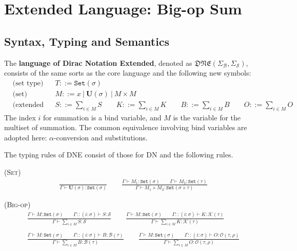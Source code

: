 \documentclass[manuscript, review, timestamp]{acmart}
\newcommand*{\Sc}{\mathcal{S}}
\newcommand*{\K}{\mathcal{K}}
\newcommand*{\B}{\mathcal{B}}
\newcommand*{\Op}{\mathcal{O}}
\begin{document}

\section{Extended Language: Big-op Sum}

\subsection{Syntax, Typing and Semantics}
\begin{definition}[DNE]
    The \textbf{language of Dirac Notation Extended}, denoted as $\mathfrak{DNE}(\Sigma_\mathcal{B}, \Sigma_\mathcal{S})$, consists of the same sorts as the core language and the following new symbols:
    \begin{align*}
        & \text{(set type)} && T ::= \texttt{Set}(\sigma) \\
        & \text{(set)} && M ::= x\ |\ \mathbf{U}(\sigma)\ |\ M \times M \\
        & \text{(extended Dirac notation)} && S ::= \sum_{i \in M} S
        \qquad K ::= \sum_{i \in M} K
        \qquad B ::= \sum_{i \in M} B
        \qquad O ::= \sum_{i \in M} O
    \end{align*}
    The index $i$ for summation is a bind variable, and $M$ is the variable for the multiset of summation. The common equivalence involving bind variables are adopted here: $\alpha$-conversion and substitutions.
\end{definition}


The typing rules of DNE consist of those for DN and the following rules.

\textsc{(Set)}
\begin{gather*}
  \frac{}{\Gamma \vdash \mathbf{U}(\sigma) : \texttt{Set}(\sigma)}
  \qquad
  \frac{\Gamma \vdash M_1 : \texttt{Set}(\sigma) \qquad \Gamma \vdash M_2 : \texttt{Set}(\tau)}{\Gamma \vdash M_1 \times M_2 : \texttt{Set}(\sigma \times \tau)}
\end{gather*}

\textsc{(Big-op)}
\begin{gather*}
  \frac{\Gamma \vdash M : \texttt{Set}(\sigma) \qquad \Gamma::(i : \sigma) \vdash S : \Sc}{\Gamma \vdash \sum_{i \in M} S : \Sc}
  \qquad
  \frac{\Gamma \vdash M : \texttt{Set}(\sigma) \qquad \Gamma::(i : \sigma) \vdash K : \K(\tau)}{\Gamma \vdash \sum_{i \in M} K : \K(\tau)} \\
  \\
  \frac{\Gamma \vdash M : \texttt{Set}(\sigma) \qquad \Gamma::(i : \sigma) \vdash B : \B(\tau)}{\Gamma \vdash \sum_{i \in M} B : \B(\tau)}
  \qquad
  \frac{\Gamma \vdash M : \texttt{Set}(\sigma) \qquad \Gamma::(i : \sigma) \vdash O : \Op(\tau, \rho)}{\Gamma \vdash \sum_{i \in M} O : \Op(\tau, \rho)}
\end{gather*}
\end{document}
